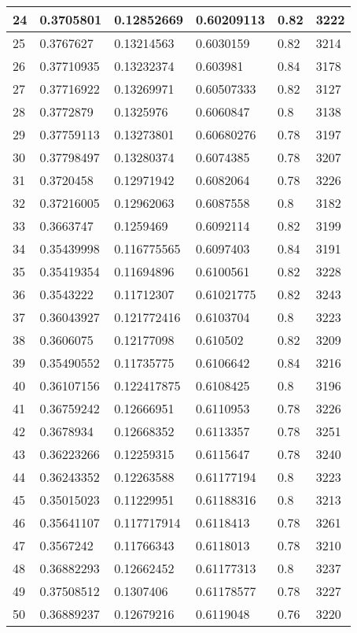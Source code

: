 \begin{longtable}{|l|l|l|l|l|l|}
24 & 0.3705801 & 0.12852669 & 0.60209113 & 0.82 & 3222 \\ \hline 
25 & 0.3767627 & 0.13214563 & 0.6030159 & 0.82 & 3214 \\ \hline 
26 & 0.37710935 & 0.13232374 & 0.603981 & 0.84 & 3178 \\ \hline 
27 & 0.37716922 & 0.13269971 & 0.60507333 & 0.82 & 3127 \\ \hline 
28 & 0.3772879 & 0.1325976 & 0.6060847 & 0.8 & 3138 \\ \hline 
29 & 0.37759113 & 0.13273801 & 0.60680276 & 0.78 & 3197 \\ \hline 
30 & 0.37798497 & 0.13280374 & 0.6074385 & 0.78 & 3207 \\ \hline 
31 & 0.3720458 & 0.12971942 & 0.6082064 & 0.78 & 3226 \\ \hline 
32 & 0.37216005 & 0.12962063 & 0.6087558 & 0.8 & 3182 \\ \hline 
33 & 0.3663747 & 0.1259469 & 0.6092114 & 0.82 & 3199 \\ \hline 
34 & 0.35439998 & 0.116775565 & 0.6097403 & 0.84 & 3191 \\ \hline 
35 & 0.35419354 & 0.11694896 & 0.6100561 & 0.82 & 3228 \\ \hline 
36 & 0.3543222 & 0.11712307 & 0.61021775 & 0.82 & 3243 \\ \hline 
37 & 0.36043927 & 0.121772416 & 0.6103704 & 0.8 & 3223 \\ \hline 
38 & 0.3606075 & 0.12177098 & 0.610502 & 0.82 & 3209 \\ \hline 
39 & 0.35490552 & 0.11735775 & 0.6106642 & 0.84 & 3216 \\ \hline 
40 & 0.36107156 & 0.122417875 & 0.6108425 & 0.8 & 3196 \\ \hline 
41 & 0.36759242 & 0.12666951 & 0.6110953 & 0.78 & 3226 \\ \hline 
42 & 0.3678934 & 0.12668352 & 0.6113357 & 0.78 & 3251 \\ \hline 
43 & 0.36223266 & 0.12259315 & 0.6115647 & 0.78 & 3240 \\ \hline 
44 & 0.36243352 & 0.12263588 & 0.61177194 & 0.8 & 3223 \\ \hline 
45 & 0.35015023 & 0.11229951 & 0.61188316 & 0.8 & 3213 \\ \hline 
46 & 0.35641107 & 0.117717914 & 0.6118413 & 0.78 & 3261 \\ \hline 
47 & 0.3567242 & 0.11766343 & 0.6118013 & 0.78 & 3210 \\ \hline 
48 & 0.36882293 & 0.12662452 & 0.61177313 & 0.8 & 3237 \\ \hline 
49 & 0.37508512 & 0.1307406 & 0.61178577 & 0.78 & 3227 \\ \hline 
50 & 0.36889237 & 0.12679216 & 0.6119048 & 0.76 & 3220 \\ \hline 
\end{longtable}